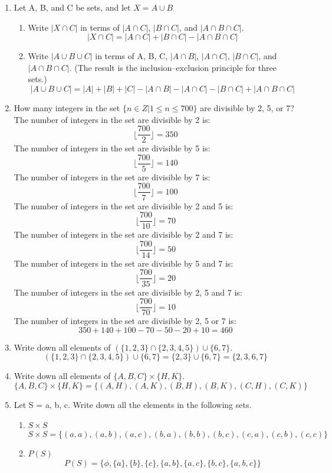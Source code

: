 \documentclass[12pt]{article}
\begin{document}
\begin{enumerate}
  \item Let A, B, and C be sets, and let $X = A \cup B$
  \begin{enumerate}
    \item Write $|X \cap C|$ in terms of $|A \cap C|$, $|B \cap C|$, and $|A \cap B \cap C|$. 
    \[|X \cap C| = |A \cap C| + |B \cap C| - |A \cap B \cap C|\]
    \item Write $|A \cup B \cup C|$ in terms of A, B, C, $|A \cap B|$, $|A \cap C|$, $|B \cap C|$, and $|A \cap B \cap C|$. (The result is the inclusion–exclusion principle for three sets.)
    \[|A \cup B \cup C| = |A| + |B| + |C| - |A \cap B| - |A \cap C| - |B \cap C| + |A \cap B \cap C|\]
  \end{enumerate}
  \item How many integers in the set $\{n \in Z | 1 \leq n \leq 700\}$ are divisible by 2, 5, or 7?
  The number of integers in the set are divisible by 2 is:
    \[\lfloor \frac{700}{2} \rfloor = 350\]
  The number of integers in the set are divisible by 5 is:
    \[\lfloor \frac{700}{5} \rfloor = 140\]
  The number of integers in the set are divisible by 7 is:
    \[\lfloor \frac{700}{7} \rfloor = 100\]
  The number of integers in the set are divisible by 2 and 5 is:
    \[\lfloor \frac{700}{10} \rfloor = 70\]
  The number of integers in the set are divisible by 2 and 7 is:
    \[\lfloor \frac{700}{14} \rfloor = 50\]
  The number of integers in the set are divisible by 5 and 7 is:
    \[\lfloor \frac{700}{35} \rfloor = 20\]
  The number of integers in the set are divisible by 2, 5 and 7 is:
    \[\lfloor \frac{700}{70} \rfloor = 10\]
  The number of integers in the set are divisible by 2, 5 or 7 is:
    \[350 + 140 + 100 - 70 - 50 - 20 + 10 = 460\]

  \item Write down all elements of $(\{1,2,3\} \cap \{2,3,4,5\}) \cup \{6,7\}$.
  \[(\{1,2,3\} \cap \{2,3,4,5\}) \cup \{6,7\} = \{2,3\} \cup \{6,7\} = \{2,3,6,7\}\]
  \item Write down all elements of $\{A, B, C\} \times \{H, K\}$.
  \[\{A, B, C\} \times \{H, K\} = \{(A,H),(A,K),(B,H),(B,K),(C,H),(C,K)\}\]
  \item Let S = {a, b, c}. Write down all the elements in the following sets.
  \begin{enumerate}
    \item $S \times S$
      \[S \times S = \{(a,a),(a,b),(a,c),(b,a),(b,b),(b,c),(c,a),(c,b),(c,c)\}\]
    \item $P(S)$
      \[P(S) = \{\phi, \{a\}, \{b\}, \{c\}, \{a,b\}, \{a,c\}, \{b,c\}, \{a,b,c\}\}\]
  \end{enumerate}

\end{enumerate}
\end{document}
